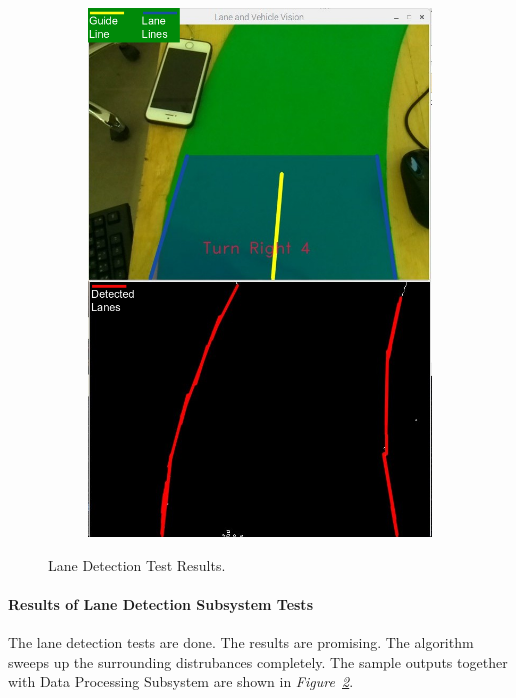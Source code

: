 \documentclass[a4paper,12pt]{article}
\begin{document}
\begin{figure}[H]
\begin{subfigure}{.5\textwidth}
			\includegraphics[width=0.48\unitlength]{images/detection2-legend}
	  		\caption{\label{fig:}}
		\end{subfigure}
	\caption{\label{fig:detection-test-results}Lane Detection Test Results. }
	\end{figure}
	\paragraph{Results of Lane Detection Subsystem Tests}
	The lane detection tests are done. The results are promising. The algorithm sweeps up the surrounding distrubances completely. The sample outputs together with Data Processing Subsystem are shown in \textit{Figure~\ref{fig:detection-test-results}}.
	
\end{document}
